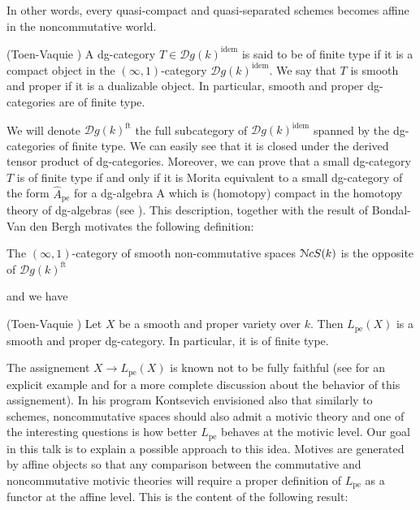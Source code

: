 \begin{refsection}
In other words, every quasi-compact and quasi-separated schemes becomes affine in the noncommutative world.

\begin{defin}(Toen-Vaquie \cite{toen-vaquie})
A dg-category $T\in \mathcal{D}g(k)^\mathrm{idem}$ is said to be of finite type if it is a compact object in the $(\infty,1)$-category $\mathcal{D}g(k)^\mathrm{idem}$.  We say that $T$ is smooth and proper if it is a dualizable object. In particular, smooth and proper dg-categories are of finite type. 
\end{defin}

We will denote $\mathcal{D}g(k)^\mathrm{ft}$ the full subcategory of $\mathcal{D}g(k)^\mathrm{idem}$ spanned by the dg-categories of finite type. We can easily see that it is closed under the derived tensor product of dg-categories. Moreover, we can prove that a small dg-category $T$ is of finite type if and only if it is Morita equivalent to a small dg-category of the form $\widehat{A}_\mathrm{pe}$ for a dg-algebra A which is (homotopy) compact in the homotopy theory of dg-algebras (see \cite{toen-vaquie}). This description, together with the result of Bondal- Van den Bergh motivates the following definition:

\begin{defin}
The $(\infty,1)$-category of smooth non-commutative spaces $\mathcal{N}cS(k)$ is the opposite of $\mathcal{D}g(k)^\mathrm{ft}$
\end{defin}

\noindent and we have

\begin{prop}(Toen-Vaquie \cite[3.27]{toen-vaquie})
Let $X$ be a smooth and proper variety over $k$. Then $L_\mathrm{pe}(X)$ is a smooth and proper dg-category. In particular, it is of finite type.
\end{prop}

The assignement $X\to L_{\mathrm{pe}}(X)$ is known not to be fully faithful (see \cite{MR2067481} for an explicit example and \cite{MR2296422} for a more complete discussion about the behavior of this assignement). In his program \cite{kontsevich1, kontsevich2} Kontsevich envisioned also that similarly to schemes, noncommutative spaces should also admit a motivic theory and one of the interesting questions is how better $L_\mathrm{pe}$ behaves at the motivic level. Our goal in this talk is to explain a possible approach to this idea. Motives are generated by affine objects so that any comparison between the commutative and noncommutative motivic theories will require a proper definition of $L_\mathrm{pe}$ as a functor at the affine level. This is the content of the following result:


\end{refsection}
